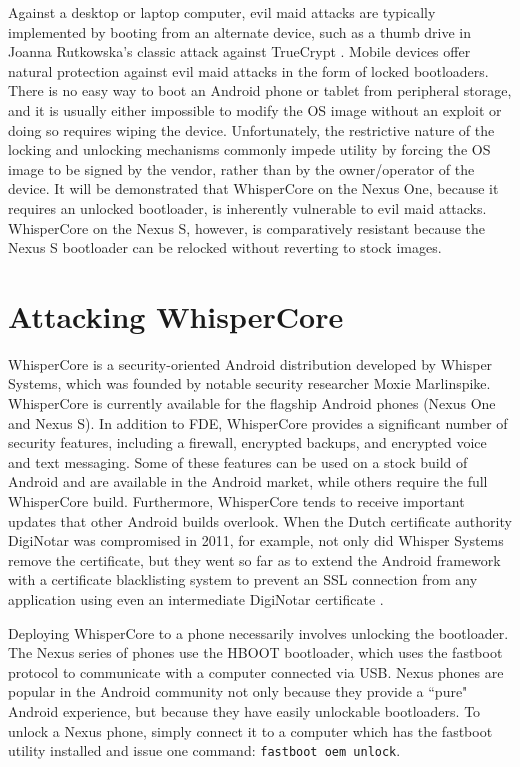 Against a desktop or laptop computer, evil maid attacks are typically implemented by booting from an alternate device, such as a
thumb drive in Joanna Rutkowska's classic attack against TrueCrypt \cite{evilmaid}.  Mobile devices offer natural protection against evil
maid attacks in the form of locked bootloaders.  There is no easy way to boot an Android phone or tablet from peripheral storage,
and it is usually either impossible to modify the OS image without an exploit or doing so requires wiping the device.
Unfortunately, the restrictive nature of the locking and unlocking mechanisms commonly impede utility by forcing the OS image to be
signed by the vendor, rather than by the owner/operator of the device. It will be demonstrated that WhisperCore on the Nexus One,
because it requires an unlocked bootloader, is inherently vulnerable to evil maid attacks.  WhisperCore on the Nexus S, however, is
comparatively resistant because the Nexus S bootloader can be relocked without reverting to stock images.  

\section{Attacking WhisperCore}
WhisperCore is a security-oriented Android distribution developed by Whisper Systems, which was founded by notable security
researcher Moxie Marlinspike.  WhisperCore is currently available for the flagship Android phones (Nexus One and Nexus S). In
addition to FDE, WhisperCore provides a significant number of security features, including a firewall, encrypted backups, and
encrypted voice and text messaging.  Some of these features can be used on a stock build of Android and are available in the Android
market, while others require the full WhisperCore build.  Furthermore, WhisperCore tends to receive important updates that other
Android builds overlook. When the Dutch certificate authority DigiNotar was compromised in 2011, for example, not only did Whisper
Systems remove the certificate, but they went so far as to extend the Android framework with a certificate blacklisting system to
prevent an SSL connection from any application using even an intermediate DigiNotar certificate \cite{whispernotar}. 

Deploying WhisperCore to a phone necessarily involves unlocking the bootloader.  The Nexus series of phones use the HBOOT
bootloader, which uses the fastboot protocol to communicate with a computer connected via USB.  Nexus phones are popular in the
Android community not only because they provide a ``pure" Android experience, but because they have easily unlockable bootloaders.
To unlock a Nexus phone, simply connect it to a computer which has the fastboot utility installed and issue one command:
\texttt{fastboot oem unlock}.

